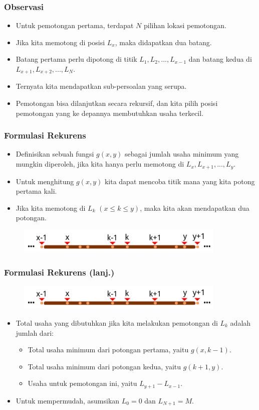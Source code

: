 \begin{frame}
\frametitle{Observasi}
\begin{itemize}
  \item Untuk pemotongan pertama, terdapat $N$ pilihan lokasi pemotongan.
  \item Jika kita memotong di posisi $L_x$, maka didapatkan dua batang.
  \item Batang pertama perlu dipotong di titik $L_1, L_2, ..., L_{x-1}$ dan batang kedua di $L_{x+1}, L_{x+2}, ..., L_N$.
  \item Ternyata kita mendapatkan sub-persoalan yang serupa.
  \item Pemotongan bisa dilanjutkan secara rekursif, dan kita pilih posisi pemotongan yang ke depannya membutuhkan usaha terkecil.
\end{itemize}
\end{frame}

\begin{frame}
\frametitle{Formulasi Rekurens}
\begin{itemize}
  \item Definisikan sebuah fungsi $g(x,y)$ sebagai jumlah usaha minimum yang mungkin diperoleh, jika kita hanya perlu memotong di $L_{x}, L_{x+1}, ..., L_{y}$.
  \item Untuk menghitung $g(x,y)$ kita dapat mencoba titik mana yang kita potong pertama kali.
  \item Jika kita memotong di $L_k$ $(x \leq k \leq y)$, maka kita akan mendapatkan dua potongan.
\end{itemize}
\begin{figure}
  \includegraphics[width=10cm]{asset/cutting-stick-4.pdf}
\end{figure}
\end{frame}

\begin{frame}
\frametitle{Formulasi Rekurens (lanj.)}
\begin{figure}
  \includegraphics[width=10cm]{asset/cutting-stick-4.pdf}
\end{figure}
\begin{itemize}
  \item Total usaha yang dibutuhkan jika kita melakukan pemotongan di $L_k$ adalah jumlah dari:
  \begin{itemize}
    \item Total usaha minimum dari potongan pertama, yaitu $g(x,k-1)$.
    \item Total usaha minimum dari potongan kedua, yaitu $g(k+1,y)$.
    \item Usaha untuk pemotongan ini, yaitu $L_{y+1} - L_{x-1}$.
  \end{itemize}
  \item Untuk mempermudah, asumsikan $L_0 = 0$ dan $L_{N+1} = M$.
\end{itemize}
\end{frame}

